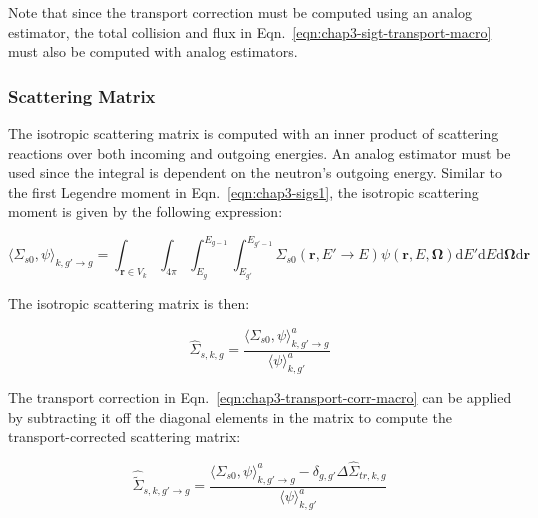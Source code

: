 \noindent Note that since the transport correction must be computed using an analog estimator, the total collision and flux in Eqn.~\ref{eqn:chap3-sigt-transport-macro} must also be computed with analog estimators.


\subsubsection{Scattering Matrix}
\label{subsubsec:chap3-tally-types-scatt-mat}

The isotropic scattering matrix is computed with an inner product of scattering reactions over both incoming and outgoing energies. An analog estimator must be used since the integral is dependent on the neutron's outgoing energy. Similar to the first Legendre moment in Eqn.~\ref{eqn:chap3-sigs1}, the isotropic scattering moment is given by the following expression:

\begin{equation}
\label{eqn:chap3-sigs0}
\langle \Sigma_{s0}, \psi \rangle_{k,g'\rightarrow g} = \int_{\mathbf{r} \in V_{k}} \int_{4\pi} \int_{E_{g}}^{E_{g-1}} \int_{E_{g'}}^{E_{g'-1}} \Sigma_{s0}(\mathbf{r},E'\rightarrow E)\psi(\mathbf{r},E,\mathbf{\Omega}) \mathrm{d}E'\mathrm{d}E\mathrm{d}\mathbf{\Omega}\mathrm{d}\mathbf{r}
\end{equation}

\noindent The isotropic scattering matrix is then:

\begin{equation}
\label{eqn:chap3-scatter-macro}
\hat{\Sigma}_{s,k,g} = \frac{\langle \Sigma_{s0}, \psi \rangle_{k,g'\rightarrow g}^{a}}{\langle \psi \rangle_{k,g'}^{a}}
\end{equation}

\noindent The transport correction in Eqn.~\ref{eqn:chap3-transport-corr-macro} can be applied by subtracting it off the diagonal elements in the matrix to compute the transport-corrected scattering matrix:

\begin{equation}
\label{eqn:chap3-scatter-trans-macro}
\hat{\tilde{\Sigma}}_{s,k,g'\rightarrow g} = \frac{\langle \Sigma_{s0}, \psi \rangle_{k,g'\rightarrow g}^{a} - \delta_{g,g'} \Delta\hat{\Sigma}_{tr,k,g}}{\langle \psi \rangle_{k,g'}^{a}}
\end{equation}




